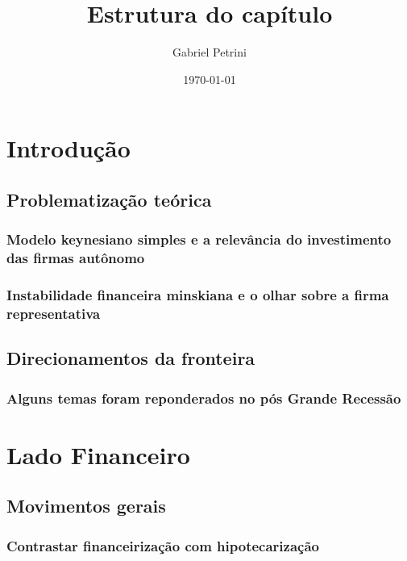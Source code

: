 \documentclass[11pt]{article}
\author{Gabriel Petrini}
\date{\today}
\title{Estrutura do capítulo}
\begin{document}
\maketitle

\section{Introdução}
\label{sec:org0b0dd75}
\subsection{Problematização teórica}
\label{sec:orgff9fbd5}
\subsubsection{Modelo keynesiano simples e a relevância do investimento das firmas autônomo}
\label{sec:org3575b5b}

\subsubsection{Instabilidade financeira minskiana e o olhar sobre a firma representativa}
\label{sec:org219e270}

\subsection{Direcionamentos da fronteira}
\label{sec:orgba3daaa}

\subsubsection{Alguns temas foram reponderados no pós Grande Recessão}
\label{sec:orgd06fcfb}

\section{Lado Financeiro}
\label{sec:org59f33c7}

\subsection{Movimentos gerais}
\label{sec:org9ef048e}

\subsubsection{Contrastar financeirização com hipotecarização}
\label{sec:orga95a1c3}
\end{document}

